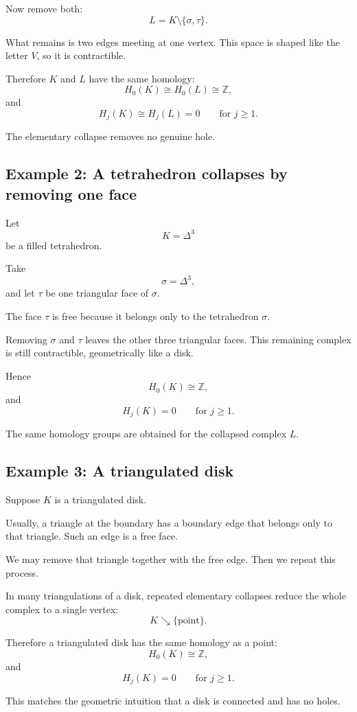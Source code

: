 \documentclass[12pt,a4paper]{article}
\theoremstyle{notespace}
\begin{document}
Now remove both:
\[
L=K\setminus\{\sigma,\tau\}.
\]

What remains is two edges meeting at one vertex. This space is shaped like the letter \(V\), so it is contractible.

Therefore \(K\) and \(L\) have the same homology:
\[
H_0(K)\cong H_0(L)\cong \mathbb Z,
\]
and
\[
H_j(K)\cong H_j(L)=0
\qquad
\text{for } j\geq 1.
\]

The elementary collapse removes no genuine hole.

\subsection{Example 2: A tetrahedron collapses by removing one face}

Let
\[
K=\Delta^3
\]
be a filled tetrahedron.

Take
\[
\sigma=\Delta^3,
\]
and let \(\tau\) be one triangular face of \(\sigma\).

The face \(\tau\) is free because it belongs only to the tetrahedron \(\sigma\).

Removing \(\sigma\) and \(\tau\) leaves the other three triangular faces. This remaining complex is still contractible, geometrically like a disk.

Hence
\[
H_0(K)\cong \mathbb Z,
\]
and
\[
H_j(K)=0
\qquad
\text{for } j\geq 1.
\]

The same homology groups are obtained for the collapsed complex \(L\).

\subsection{Example 3: A triangulated disk}

Suppose \(K\) is a triangulated disk.

Usually, a triangle at the boundary has a boundary edge that belongs only to that triangle. Such an edge is a free face.

We may remove that triangle together with the free edge. Then we repeat this process.

In many triangulations of a disk, repeated elementary collapses reduce the whole complex to a single vertex:
\[
K\searrow \{\text{point}\}.
\]

Therefore a triangulated disk has the same homology as a point:
\[
H_0(K)\cong \mathbb Z,
\]
and
\[
H_j(K)=0
\qquad
\text{for } j\geq 1.
\]

This matches the geometric intuition that a disk is connected and has no holes.
\end{document}
